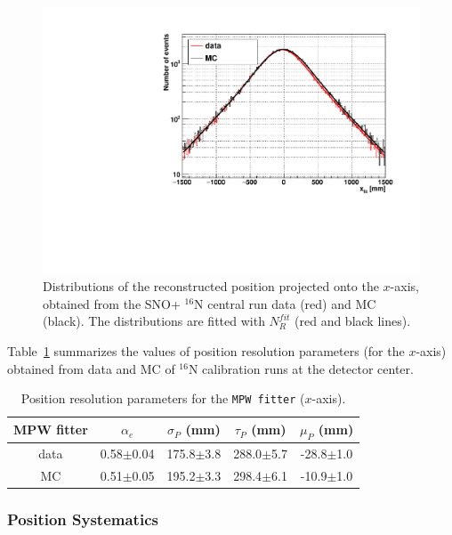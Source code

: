 \begin{figure}
	\centering
	\includegraphics[width=12cm]{posResol.pdf}
	\caption[Distributions of the reconstructed position projected onto the $x$-axis.]{Distributions of the reconstructed position projected onto the $x$-axis, obtained from the SNO+ {$^{16}$}N central run data (red) and MC (black). The distributions are fitted with $N_R^{fit}$ (red and black lines).	\label{fig:posresol}}
\end{figure}

Table~\ref{tab:posresol} summarizes the values of position resolution parameters (for the $x$-axis) obtained from data and MC of {$^{16}$}N calibration runs at the detector center.
\begin{table}[ht]
	\centering
	\caption{Position resolution parameters for the \texttt{MPW fitter} ($x$-axis).	\label{tab:posresol}}
	\vspace{3mm}
	\begin{tabular}{ccccc}
		\toprule
		MPW fitter & $\alpha_e$ & $\sigma_P$ (mm) & $\tau_P$ (mm)& $\mu_P$ (mm)\\
		\hline 
		data& 0.58$\pm$0.04 & 175.8$\pm$3.8 & 288.0$\pm$5.7 & -28.8$\pm$1.0\\
		\hline 
		MC & 0.51$\pm$0.05 & 195.2$\pm$3.3 & 298.4$\pm$6.1 & -10.9$\pm$1.0\\
		\bottomrule
	\end{tabular}
\end{table}
\vspace{1mm}

\subsubsection{Position Systematics}\label{sect:posSystematics}

